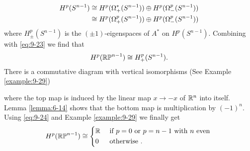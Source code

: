 \begin{example}
\begin{align*}
    H^p(S^{n-1}) 
    & \cong H^p(\Omega^*_+(S^{n-1}))\oplus H^p(\Omega^p_-(S^{n-1})) \\
    & \cong H^p(\Omega^p_+(S^{n-1}))\oplus H^p(\Omega^p_-(S^{n-1}))
  \end{align*}
  where $H^p_\pm (S^{n-1})$ is the $(\pm 1)$-eigenspaces of $A^*$ on $H^p(S^{n-1})$. Combining 
  with \eqref{eq:9-23} we find that 
  \begin{align}\label{eq:9-24}
    H^p(\mathbb{RP}^{n-1}) \cong H^p_+(S^{n-1}).
  \end{align}
  There is a commutative diagram with vertical isomorphisms (See Example \ref{example:9-29})
  \begin{center}
  \end{center}
  where the top map is induced by the linear map $x\to -x$ of $\mathbb{R}^n$ into itself.
  Lemma \ref{lemma:6-14} shows that the bottom map is multiplication by $(-1)^n$. 
  Using \eqref{eq:9-24} and Example \ref{example:9-29} we finally get
  \begin{align}
    H^p(\mathbb{RP}^{n-1})\cong \left\{\begin{aligned}
      & \mathbb{R} && \text{ if } p=0 \text{ or } p=n-1\text{ with $n$ even } \\
      & 0 && \text{ otherwise }.
    \end{aligned}\right.
  \end{align}
\end{example}